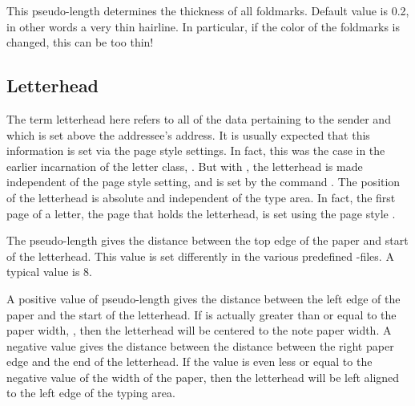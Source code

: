 \begin{Declaration}
\end{Declaration}
%
This pseudo-length determines the
thickness of all foldmarks. Default value is 0.2, in other words a
very thin hairline. In particular, if the color of the foldmarks is
changed, this can be too thin!%
%
%


\subsection{Letterhead}
\label{sec:scrlttr2-experts.firstHead}

The term letterhead here refers to all of the data pertaining to the sender
and which is set above the addressee's address. It is usually expected that
this information is set via the page style settings. In fact, this was the
case in the earlier incarnation of the letter class,
. But with , the
letterhead is made independent of the page style setting, and is set by the
command .
\iftrue%
The position of the letterhead is absolute and independent of the type
area. In fact, the first page of a letter, the page that holds the letterhead,
is set using the page style .%
\fi

\begin{Declaration}
\end{Declaration}
%
The pseudo-length  gives the distance between the top
edge of the paper and start of the letterhead. This value is set differently
in the various predefined
-files. A
typical value is 8.%
%


\begin{Declaration}
\end{Declaration}
%
A positive value of pseudo-length
 gives the distance
between the left edge of the paper and the start of the
letterhead. If is actually greater than or equal to the
paper width,
,
then the letterhead will be centered to the note paper width. A negative value
gives the distance between the distance between the right paper edge and the
end of the letterhead. If the value is even less or equal to the negative
value of the width of the paper, then the letterhead will be left aligned to
the left edge of the typing area.

